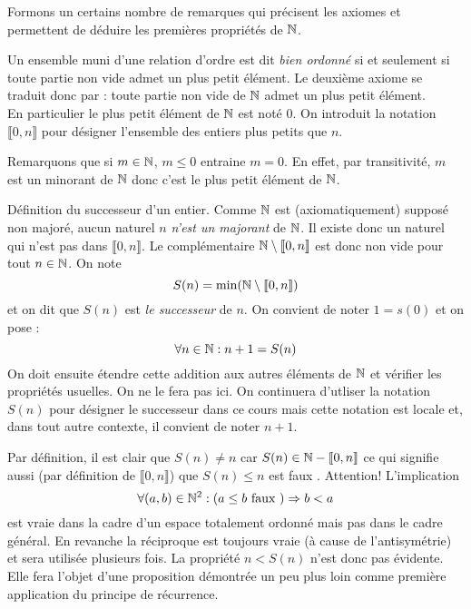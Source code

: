 Formons un certains nombre de remarques qui précisent les axiomes et permettent de déduire les premières propriétés de $\mathbb{N}$.

Un ensemble muni d'une relation d'ordre est dit \emph{bien ordonné} si et seulement si toute partie non vide admet un plus petit élément. Le deuxième axiome se traduit donc par : toute partie non vide de $\mathbb{N}$ admet un plus petit élément.\\
En particulier le plus petit élément de $\mathbb{N}$ est noté $0$. On introduit la notation $\llbracket 0, n\rrbracket$ pour désigner l'ensemble des entiers plus petits que $n$.

Remarquons que si $m\in \mathbb{N}$, $m\leq 0$ entraine $m=0$. En effet, par transitivité, $m$ est un minorant de $\mathbb{N}$ donc c'est le plus petit élément de $\mathbb{N}$.

Définition du successeur d'un entier. Comme $\mathbb{N}$ est (axiomatiquement) supposé non majoré, aucun naturel $n$ \emph{n'est un majorant} de $\mathbb{N}$. Il existe donc un naturel qui n'est pas dans $\llbracket 0, n\rrbracket$. Le complémentaire $\mathbb{N}\setminus \llbracket 0, n\rrbracket$ est donc non vide pour tout $n\in \mathbb{N}$. On note
\begin{displaymath}
 S(n) = \min (\mathbb{N}\setminus \llbracket 0, n\rrbracket)
\end{displaymath}
 et on dit que $S(n)$ est \emph{le successeur} de $n$. 
On convient de noter $1=s(0)$ et on pose :
\begin{displaymath}
 \forall n\in \mathbb{N} : n+1 =S(n)
\end{displaymath}
On doit ensuite étendre cette addition aux autres éléments de $\mathbb{N}$ et vérifier les propriétés usuelles. On ne le fera pas ici. On continuera d'utliser la notation $S(n)$ pour désigner le successeur dans ce cours mais cette notation est locale et, dans tout autre contexte, il convient de noter $n+1$.
\begin{rem}
Par définition, il est clair que $S(n)\neq n$ car $S(n)\in \mathbb{N}-\llbracket 0, n \rrbracket$ ce qui signifie aussi (par définition de $\llbracket 0, n \rrbracket $) que $S(n)\leq n$ est faux . Attention! L'implication
\begin{displaymath}
 \forall (a,b)\in\mathbb{N}^2 : \left( a\leq b \text{ faux } \right) \Rightarrow b < a
\end{displaymath}
est vraie dans la cadre d'un espace totalement ordonné mais pas dans le cadre général. En revanche la réciproque est toujours vraie (à cause de l'antisymétrie) et sera utilisée plusieurs fois. 
La propriété $n < S(n)$ n'est donc pas évidente. Elle fera l'objet d'une proposition démontrée un peu plus loin comme première application du principe de récurrence.
\end{rem}

